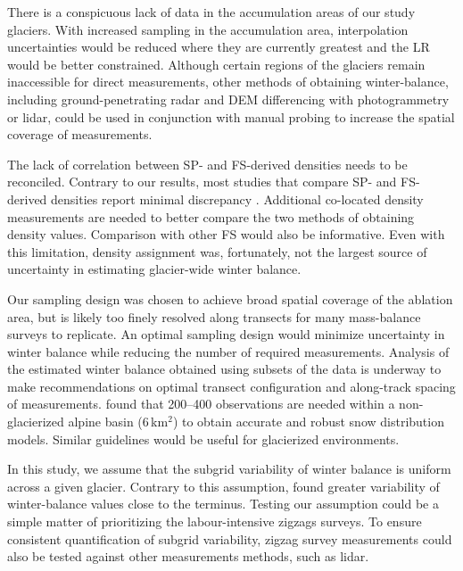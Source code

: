 \documentclass[twocolumn, letterpaper]{igs}
\begin{document}
There is a conspicuous lack of data in the accumulation areas of our study glaciers. With increased sampling in the accumulation area, interpolation uncertainties would be reduced where they are currently greatest and the LR would be better constrained. Although certain regions of the glaciers remain inaccessible for direct measurements, other methods of obtaining winter-balance, including ground-penetrating radar and DEM differencing with photogrammetry or lidar, could be used in conjunction with manual probing to increase the spatial coverage of measurements.

The lack of correlation between SP- and FS-derived densities needs to be reconciled. Contrary to our results, most studies that compare SP- and FS-derived densities report minimal discrepancy \citep[e.g.][and sources within]{Dixon2012}. Additional co-located density measurements are needed to better compare the two methods of obtaining density values. Comparison with other FS would also be informative. Even with this limitation, density assignment was, fortunately, not the largest source of uncertainty in estimating glacier-wide winter balance. 

Our sampling design was chosen to achieve broad spatial coverage of the ablation area, but is likely too finely resolved along transects for many mass-balance surveys to replicate. An optimal sampling design would minimize uncertainty in winter balance while reducing the number of required measurements. Analysis of the estimated winter balance obtained using subsets of the data is underway to make recommendations on optimal transect configuration and along-track spacing of measurements. \cite{Lopez2010} found that 200--400 observations are needed within a non-glacierized alpine basin (6\,km$^2$) to obtain accurate and robust snow distribution models. Similar guidelines would be useful for glacierized environments.

In this study, we assume that the subgrid variability of winter balance is uniform across a given glacier. Contrary to this assumption, \cite{McGrath2015} found greater variability of winter-balance values close to the terminus. Testing our assumption could be a simple matter of prioritizing the labour-intensive zigzags surveys. To ensure consistent quantification of subgrid variability, zigzag survey measurements could also be tested against other measurements methods, such as lidar. 
\end{document}

